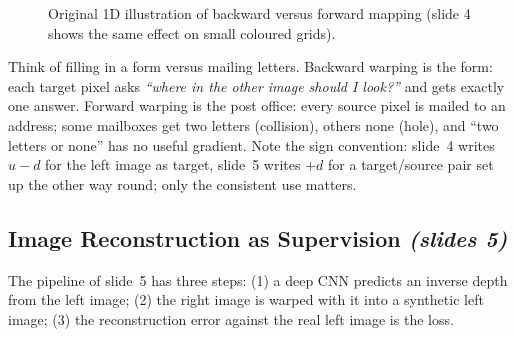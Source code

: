 \documentclass[11pt,a4paper]{article}
\numberwithin{equation}{section}
\newcommand{\slides}[1]{\texorpdfstring{\;\emph{(slides #1)}}{ (slides #1)}}
\theoremstyle{plain}
\theoremstyle{definition}
\begin{document}
\begin{figure}[H]
\centering
{}
\caption{Original 1D illustration of backward versus forward mapping (slide 4 shows the same effect on small coloured grids).}
\end{figure}

\begin{intuition}
Think of filling in a form versus mailing letters. Backward warping is the form: each target pixel asks \emph{``where in the other image should I look?''} and gets exactly one answer. Forward warping is the post office: every source pixel is mailed to an address; some mailboxes get two letters (collision), others none (hole), and ``two letters or none'' has no useful gradient. Note the sign convention: slide~4 writes $u-d$ for the left image as target, slide~5 writes $+d$ for a target/source pair set up the other way round; only the consistent use matters.
\end{intuition}

\subsection{Image Reconstruction as Supervision \slides{5}}
The pipeline of slide~5 has three steps: (1) a deep CNN predicts an inverse depth from the left image; (2) the right image is warped with it into a synthetic left image; (3) the reconstruction error against the real left image is the loss.
\end{document}
